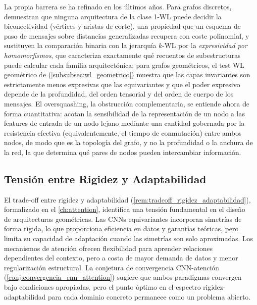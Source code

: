 La propia barrera se ha refinado en los últimos años. Para grafos discretos, \citet{zhang2023biconnectivity} demuestran que ninguna arquitectura de la clase 1-WL puede decidir la biconectividad (vértices y aristas de corte), una propiedad que un esquema de paso de mensajes sobre distancias generalizadas recupera con coste polinomial, y \citet{zhang2024beyondwl} sustituyen la comparación binaria con la jerarquía $k$-WL por la \textit{expresividad por homomorfismos}, que caracteriza exactamente qué recuentos de subestructuras puede calcular cada familia arquitectónica; para grafos geométricos, el test WL geométrico de \citet{joshi2023expressive} (\autoref{subsubsec:wl_geometrico}) muestra que las capas invariantes son estrictamente menos expresivas que las equivariantes y que el poder expresivo depende de la profundidad, del orden tensorial y del orden de cuerpo de los mensajes. El \gls{oversquashing}, la obstrucción complementaria, se entiende ahora de forma cuantitativa: \citet{digiovanni2023oversquashing} acotan la sensibilidad de la representación de un nodo a las features de entrada de un nodo lejano mediante una cantidad gobernada por la resistencia efectiva (equivalentemente, el tiempo de conmutación) entre ambos nodos, de modo que es la topología del grafo, y no la profundidad o la anchura de la red, la que determina qué pares de nodos pueden intercambiar información.

\subsection{Tensión entre Rigidez y Adaptabilidad}

El trade-off entre rigidez y adaptabilidad (\autoref{rem:tradeoff_rigidez_adaptabilidad}), formalizado en el \autoref{ch:attention}, identifica una tensión fundamental en el diseño de arquitecturas geométricas. Las \glspl{CNN} equivariantes incorporan simetrías de forma rígida, lo que proporciona eficiencia en datos y garantías teóricas, pero limita su capacidad de adaptación cuando las simetrías son solo aproximadas. Los mecanismos de atención ofrecen flexibilidad para aprender relaciones dependientes del contexto, pero a costa de mayor demanda de datos y menor regularización estructural. La conjetura de convergencia \gls{CNN}-atención (\autoref{conj:convergencia_cnn_attention}) sugiere que ambos paradigmas convergen bajo condiciones apropiadas, pero el punto óptimo en el espectro rigidez-adaptabilidad para cada dominio concreto permanece como un problema abierto.

